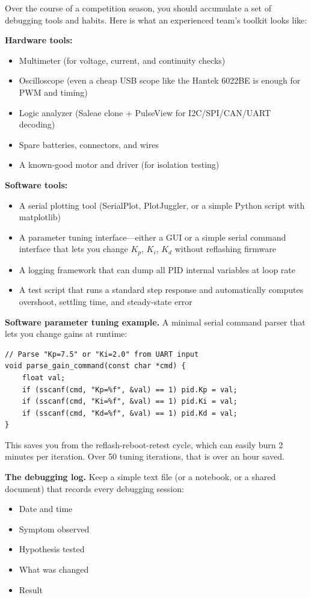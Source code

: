 Over the course of a competition season, you should accumulate a set of debugging tools and habits. Here is what an experienced team's toolkit looks like:

\textbf{Hardware tools:}
\begin{itemize}
    \item Multimeter (for voltage, current, and continuity checks)
    \item Oscilloscope (even a cheap USB scope like the Hantek 6022BE is enough for PWM and timing)
    \item Logic analyzer (Saleae clone + PulseView for I2C/SPI/CAN/UART decoding)
    \item Spare batteries, connectors, and wires
    \item A known-good motor and driver (for isolation testing)
\end{itemize}

\textbf{Software tools:}
\begin{itemize}
    \item A serial plotting tool (SerialPlot, PlotJuggler, or a simple Python script with matplotlib)
    \item A parameter tuning interface---either a GUI or a simple serial command interface that lets you change $K_p$, $K_i$, $K_d$ without reflashing firmware
    \item A logging framework that can dump all PID internal variables at loop rate
    \item A test script that runs a standard step response and automatically computes overshoot, settling time, and steady-state error
\end{itemize}

\textbf{Software parameter tuning example.} A minimal serial command parser that lets you change gains at runtime:

\begin{verbatim}
// Parse "Kp=7.5" or "Ki=2.0" from UART input
void parse_gain_command(const char *cmd) {
    float val;
    if (sscanf(cmd, "Kp=%f", &val) == 1) pid.Kp = val;
    if (sscanf(cmd, "Ki=%f", &val) == 1) pid.Ki = val;
    if (sscanf(cmd, "Kd=%f", &val) == 1) pid.Kd = val;
}
\end{verbatim}

This saves you from the reflash-reboot-retest cycle, which can easily burn 2 minutes per iteration. Over 50 tuning iterations, that is over an hour saved.

\textbf{The debugging log.} Keep a simple text file (or a notebook, or a shared document) that records every debugging session:
\begin{itemize}
    \item Date and time
    \item Symptom observed
    \item Hypothesis tested
    \item What was changed
    \item Result
\end{itemize}

